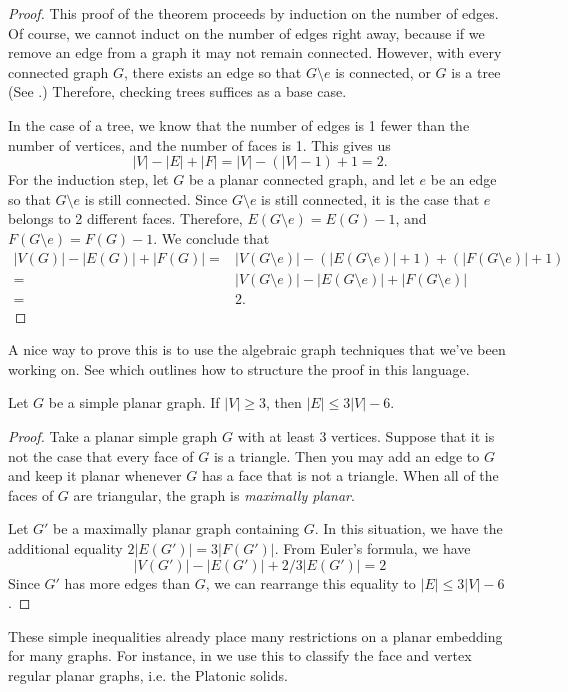 \begin{proof}
 This proof of the theorem proceeds by induction on the number of edges. Of course, we cannot induct on the number of edges right away, because if we remove an edge from a graph it may not remain connected. However, with every connected graph $G$, there exists an edge so that $G\setminus e$ is connected, or $G$ is a tree (See .) Therefore, checking trees suffices as a base case.

 In the case of a tree, we know that the number of edges is 1 fewer than the number of vertices, and the number of faces is 1. This gives us 
 \[|V|-|E|+|F|=|V|-(|V|-1)+1=2.\]
 For the induction step, let $G$ be a planar connected graph, and let $e$ be an edge so that $G\setminus e$ is still connected. Since $G\setminus e$ is still connected, it is the case that $e$ belongs to 2 different faces. Therefore, $E(G\setminus e)=E(G)-1$, and $F(G\setminus e)=F(G)-1$. We conclude that 
 \begin{align*}
 |V(G)|-|E(G)|+|F(G)|= &|V(G\setminus e)|-(|E(G\setminus e)|+1)+(|F(G\setminus e)|+1)\\
 =&|V(G\setminus e)|-|E(G\setminus e)|+|F(G\setminus e)|\\
 =&2.
 \end{align*}
\end{proof}
A nice way to prove this is to use the algebraic graph techniques that we've been working on. See  which outlines how to structure the proof in this language. 
\begin{corollary}
Let $G$ be a simple planar graph. If $|V|\geq 3$, then $|E|\leq 3|V|-6$. 
\label{emb:cor:inequality}
\end{corollary}
\begin{proof}
 Take a planar simple graph $G$ with at least 3 vertices. Suppose that it is not the case that every face of $G$ is a triangle. Then you may add an edge to $G$ and keep it planar whenever $G$ has a face that is not a triangle. When all of the faces of $G$ are triangular, the graph is \emph{maximally planar}.

 Let $G'$ be a maximally planar graph containing $G$. In this situation, we have the additional equality $2|E(G')|=3|F(G')|$. From Euler's formula, we have 
 \[|V(G')|-|E(G')|+2/3 |E(G')|=2\]
Since $G'$ has more edges than $G$, we can rearrange this equality to $|E|\leq 3|V|-6$. 
\end{proof}
These simple inequalities already place many restrictions on a planar embedding for many graphs. For instance, in  we use this to classify the face and vertex regular planar graphs, i.e. the Platonic solids. 

